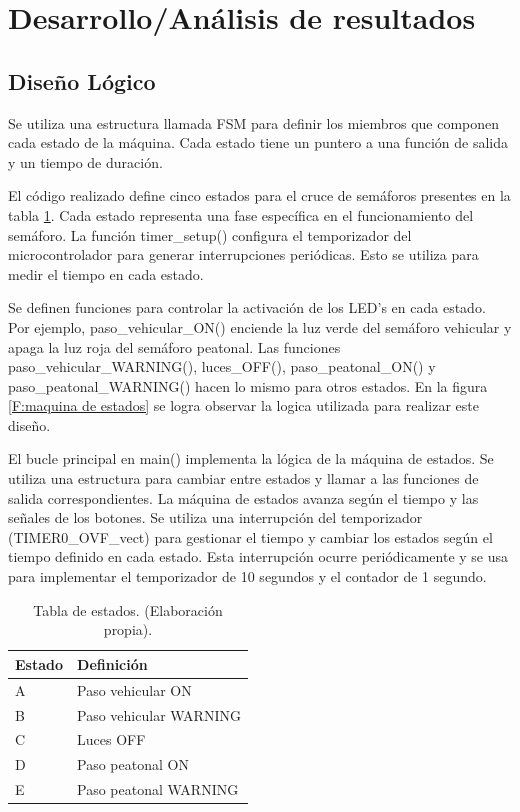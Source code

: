 \documentclass[12pt,letterpaper]{article}     %
\begin{document}
\section{Desarrollo/An\'alisis de resultados}


\subsection{Diseño Lógico}
Se utiliza una estructura llamada FSM para definir los miembros que componen cada estado de la máquina. Cada estado tiene un puntero a una función de salida y un tiempo de duración.

El código realizado define cinco estados para el cruce de semáforos presentes en la tabla \ref{T:estados}. Cada estado representa una fase específica en el funcionamiento del semáforo. La función timer\_setup() configura el temporizador del microcontrolador para generar interrupciones periódicas. Esto se utiliza para medir el tiempo en cada estado.

Se definen funciones para controlar la activación de los LED's en cada estado. Por ejemplo, paso\_vehicular\_ON() enciende la luz verde del semáforo vehicular y apaga la luz roja del semáforo peatonal. Las funciones paso\_vehicular\_WARNING(), luces\_OFF(), paso\_peatonal\_ON() y paso\_peatonal\_WARNING() hacen lo mismo para otros estados. En la figura \ref{F:maquina de estados} se logra observar la logica utilizada para realizar este diseño.

El bucle principal en main() implementa la lógica de la máquina de estados. Se utiliza una estructura para cambiar entre estados y llamar a las funciones de salida correspondientes. La máquina de estados avanza según el tiempo y las señales de los botones. Se utiliza una interrupción del temporizador (TIMER0\_OVF\_vect) para gestionar el tiempo y cambiar los estados según el tiempo definido en cada estado. Esta interrupción ocurre periódicamente y se usa para implementar el temporizador de 10 segundos y el contador de 1 segundo.

\begin{table}[H]
        \centering
        \begin{tabular}{| m{3cm} | m{5cm} |}
          \hline
          \textbf{Estado} &  \textbf{Definición}  \\
        \hline 
        A & Paso vehicular ON \\
        \hline
        B & Paso vehicular WARNING \\
         \hline
         C & Luces OFF\\
         \hline
         D  & Paso peatonal ON  \\
         \hline
         E & Paso peatonal WARNING  \\
         \hline
        \end{tabular}
        \caption{Tabla de estados. (Elaboración propia). }
        \label{T:estados}
\end{table}
\end{document}

